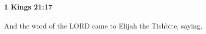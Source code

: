 
		\paragraph{1 Kings 21:17} %
			\label{1KINGS-21-17}

			And the word of the LORD came to Elijah the Tishbite, saying,


